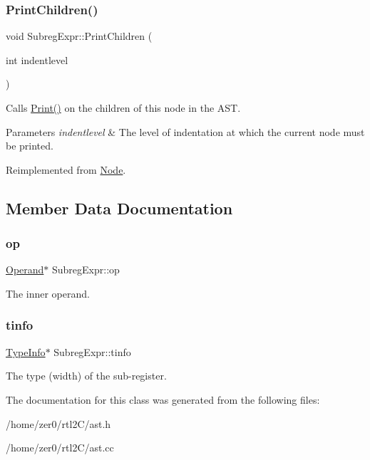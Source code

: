 \subsubsection{\texorpdfstring{Print\+Children()}{PrintChildren()}}
{\footnotesize\ttfamily void Subreg\+Expr\+::\+Print\+Children (\begin{DoxyParamCaption}\item[{int}]{indentlevel }\end{DoxyParamCaption})\hspace{0.3cm}{\ttfamily [virtual]}}

Calls \hyperlink{class_node_a9ef727fd72d1a37792b3db60a8a479dd}{Print()} on the children of this node in the A\+ST. 
\begin{DoxyParams}{Parameters}
{\em indentlevel} & The level of indentation at which the current node must be printed. \\
\hline
\end{DoxyParams}


Reimplemented from \hyperlink{class_node_a3e67ec8d22182b721717af14fe0c3000}{Node}.



\subsection{Member Data Documentation}
\mbox{\label{class_subreg_expr_a3cbc3de0867bd62be54698de5d4c24ac}} 
\subsubsection{\texorpdfstring{op}{op}}
{\footnotesize\ttfamily \hyperlink{class_operand}{Operand}$\ast$ Subreg\+Expr\+::op\hspace{0.3cm}{\ttfamily [protected]}}

The inner operand. \mbox{\label{class_subreg_expr_a7ab464c6b134f8a695c333d46ca3802a}} 
\subsubsection{\texorpdfstring{tinfo}{tinfo}}
{\footnotesize\ttfamily \hyperlink{class_type_info}{Type\+Info}$\ast$ Subreg\+Expr\+::tinfo\hspace{0.3cm}{\ttfamily [protected]}}

The type (width) of the sub-\/register. 

The documentation for this class was generated from the following files\+:\begin{DoxyCompactItemize}
\item 
/home/zer0/rtl2\+C/ast.\+h\item 
/home/zer0/rtl2\+C/ast.\+cc\end{DoxyCompactItemize}
